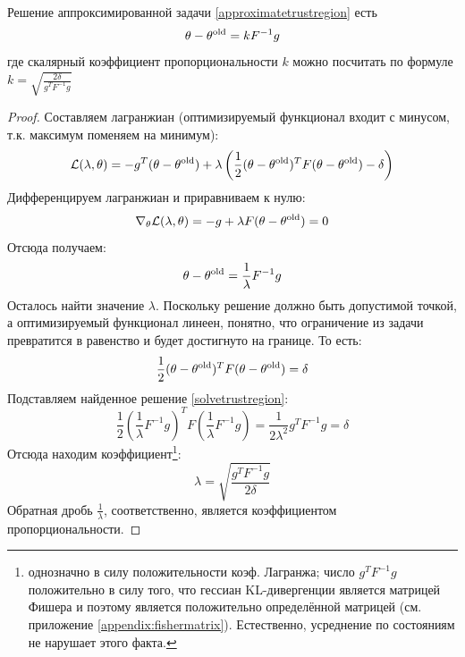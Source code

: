 \begin{theorem}
Решение аппроксимированной задачи \eqref{approximatetrustregion} есть
$$\theta - \theta^{\mathrm{old}} = kF^{-1}g$$
где скалярный коэффициент пропорциональности $k$ можно посчитать по формуле $k = \sqrt{\frac{2 \delta}{g^TF^{-1}g}}$
\begin{proof}
Составляем лагранжиан (оптимизируемый функционал входит с минусом, т.к. максимум поменяем на минимум):
$$\mathcal{L}(\lambda, \theta) = -g^T(\theta - \theta^{\mathrm{old}}) + \lambda \left( \frac{1}{2} (\theta - \theta^{\mathrm{old}})^T F (\theta - \theta^{\mathrm{old}}) - \delta \right)$$
Дифференцируем лагранжиан и приравниваем к нулю:
$$\nabla_\theta \mathcal{L}(\lambda, \theta) = -g + \lambda F (\theta - \theta^{\mathrm{old}}) = 0$$
Отсюда получаем:
\begin{equation}\label{solvetrustregion}
\theta - \theta^{\mathrm{old}} = \frac{1}{\lambda} F^{-1}g
\end{equation}
Осталось найти значение $\lambda$. Поскольку решение должно быть допустимой точкой, а оптимизируемый функционал линеен, понятно, что ограничение из задачи превратится в равенство и будет достигнуто на границе. То есть:
$$\frac{1}{2} (\theta - \theta^{\mathrm{old}})^T F (\theta - \theta^{\mathrm{old}}) = \delta$$
Подставляем найденное решение \eqref{solvetrustregion}:
$$\frac{1}{2} \left( \frac{1}{\lambda} F^{-1}g \right)^T F \left( \frac{1}{\lambda} F^{-1}g \right) = \frac{1}{2 \lambda^2} g^TF^{-1}g = \delta$$
Отсюда находим коэффициент\footnote[*]{однозначно в силу положительности коэф. Лагранжа; число $g^TF^{-1}g$ положительно в силу того, что гессиан KL-дивергенции является матрицей Фишера и поэтому является положительно определённой матрицей (см. приложение \ref{appendix:fishermatrix}). Естественно, усреднение по состояниям не нарушает этого факта.}:
$$\lambda = \sqrt{\frac{g^TF^{-1}g}{2 \delta}}$$
Обратная дробь $\frac{1}{\lambda}$, соответственно, является коэффициентом пропорциональности.
\end{proof}
\end{theorem}


